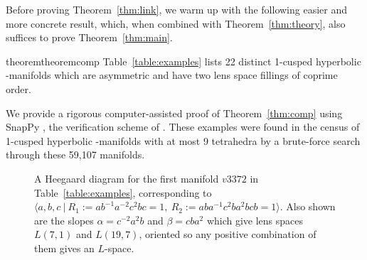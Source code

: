 Before proving Theorem~\ref{thm:link}, we warm up with the following
easier and more concrete result, which, when combined with
Theorem~\ref{thm:theory}, also suffices to prove
Theorem~\ref{thm:main}.
\begin{restatable}{theorem}{theoremcomp}\label{thm:comp}
  Table~\ref{table:examples} lists 22 distinct 1-cusped hyperbolic
  \3-manifolds which are asymmetric and have two lens space fillings
  of coprime order.
\end{restatable}
\noindent
We provide a rigorous computer-assisted proof of
Theorem~\ref{thm:comp} using SnapPy \cite{SnapPy}, the verification scheme
of \cite{hikmot2013verified}.  These examples were found in the census
of 1-cusped hyperbolic \3-manifolds with at most 9 tetrahedra
\cite{Burton2014, CallahanHildebrandWeeks1999} by a 
brute-force search through these 59{,}107 manifolds.
\begin{table}
\small
  \begin{center}
  \end{center}
  \caption{The 22 manifolds of Theorem~\ref{thm:comp}.  Here, ``\#tets'' refers to the
    canonical triangulation supplied in \cite{ancillary} and $g$ is the genus of the fibration
    of $M$ over the circle (whose existence follows from
    Theorem~\ref{thm:theory}) computed via the Alexander
    polynomial.  The lens spaces were identified using Regina
    \cite{Regina}.  The manifolds marked with a $*$ also appear in
    Theorem~\ref{thm:link}.    The
    data is all rigorous with the exception of the volume and systole
    columns, which were approximated numerically, as the methods of
    \cite{hikmot2013verified} have not yet been extended to those
    quantities.  Note that
    none of these manifolds are knot complements in $S^3$, since the
    pair of lens space surgeries have fundamental groups whose orders
    differ by more than one.}\label{table:examples}
\end{table} 
\begin{figure}
  \vspace{-0.7cm}
  \begin{center}
  \end{center}
  \vspace{-1.75cm}
  \caption{A Heegaard diagram for the first manifold $v3372$ in
    Table~\ref{table:examples}, corresponding to 
    $\big\langle a,b,c \  \big| \ R_1 := ab^{-1}a^{-2}c^2bc = 1, \  R_2 := aba^{-1}c^2ba^2bcb = 1 \big\rangle$. 
    Also shown are
    the slopes $\alpha = c^{-2}a^2b$ and $\beta = cba^2$
    which give lens spaces $L(7,1)$ and $L(19,7)$, 
    oriented so any positive combination of them gives an
    $L$-space.
  }\label{fig:v3372}
\end{figure}


